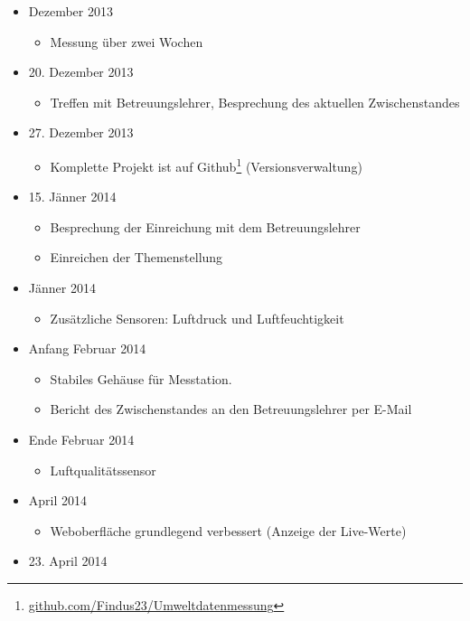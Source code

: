 \documentclass[12pt,a4paper,oneside]{scrartcl}
\begin{document}
\begin{itemize}
\begin{itemize}
	\end{itemize}
	\item Dezember 2013
	\begin{itemize}
		\item Messung über zwei Wochen
	\end{itemize}
	\item 20. Dezember 2013
	\begin{itemize}
		\item Treffen mit Betreuungslehrer, Besprechung des aktuellen Zwischenstandes
	\end{itemize}
	\item 27. Dezember 2013
	\begin{itemize}
		\item Komplette Projekt ist auf Github\footnote{\href{https://github.com/Findus23/Umweltdatenmessung}{github.com/Findus23/Umweltdatenmessung}} (Versionsverwaltung)
	\end{itemize}
	\item 15. Jänner 2014
	\begin{itemize}
		\item Besprechung der Einreichung mit dem Betreuungslehrer
		\item Einreichen der Themenstellung
	\end{itemize}
	\item Jänner 2014
	\begin{itemize}
		\item Zusätzliche Sensoren: Luftdruck und Luftfeuchtigkeit
	\end{itemize}
	\item Anfang Februar 2014
	\begin{itemize}
		\item Stabiles Gehäuse für Messtation.
		\item Bericht des Zwischenstandes an den Betreuungslehrer per E-Mail
	\end{itemize}
	\item Ende Februar 2014
	\begin{itemize}
		\item Luftqualitätssensor
	\end{itemize}
	\item April 2014
	\begin{itemize}
		\item Weboberfläche grundlegend verbessert (Anzeige der Live-Werte)
	\end{itemize}
	\item 23. April 2014
	\begin{itemize}

\end{itemize}
\end{itemize}
\end{document}
